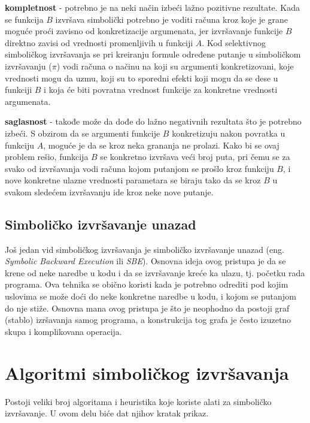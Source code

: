\documentclass[12pt,oneside]{memoir}
\begin{document}
\begin{description}
    \item \textbf{kompletnost} - potrebno je na neki način izbeći lažno pozitivne rezultate. Kada se funkcija $B$ izvršava simbolički potrebno je voditi računa kroz koje je grane moguće proći zavisno od konkretizacije argumenata, jer izvršavanje funkcije $B$ direktno zavisi od vrednosti promenljivih u funkciji $A$. Kod selektivnog simboličkog izvršavanja se pri kreiranju formule određene putanje u simboličkom izvršavanju ($\pi$) vodi računa o načinu na koji su argumenti konkretizovani, koje vrednosti mogu da uzmu, koji su to sporedni efekti koji mogu da se dese u funkciji $B$ i koja će biti povratna vrednost funkcije za konkretne vrednosti argumenata.
    
    \item \textbf{saglasnost} - takođe može da dođe do lažno negativnih rezultata što je potrebno izbeći. S obzirom da se argumenti funkcije $B$ konkretizuju nakon povratka u funkciju $A$, moguće je da se kroz neka grananja ne prolazi. Kako bi se ovaj problem rešio, funkcija $B$ se konkretno izvršava veći broj puta, pri čemu se za svako od izvršavanja vodi računa kojom putanjom se prošlo kroz funkciju $B$, i nove konkretne ulazne vrednosti parametara se biraju tako da se kroz $B$ u svakom sledećem izvršavanju ide kroz neke nove putanje.
\end{description} 
\bigskip
\subsection{Simboličko izvršavanje unazad} 
Još jedan vid simboličkog izvršavanja je simboličko izvršavanje unazad (eng. \textit{Symbolic Backward Execution} ili \textit{SBE}). Osnovna ideja ovog pristupa je da se krene od neke naredbe u kodu i da se izvršavanje kreće ka ulazu, tj. početku rada programa. Ova tehnika se obično koristi kada je potrebno odrediti pod kojim uslovima se može doći do neke konkretne naredbe u kodu, i kojom se putanjom do nje stiže. Osnovna mana ovog pristupa je što je neophodno da postoji graf (stablo) izršavanja samog programa, a konstrukcija tog grafa je često izuzetno skupa i komplikovana operacija.

\section{Algoritmi simboličkog izvršavanja}

Postoji veliki broj algoritama i heuristika koje koriste alati za simboličko izvršavanje. U ovom delu biće dat njihov kratak prikaz.
\end{document}
